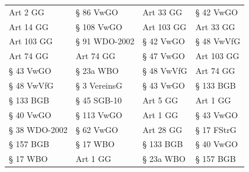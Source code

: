 \begin{tabular}{llll}
     Art 2 GG &            § 86 VwGO &  Art 33 GG &               § 42 VwGO \\
    Art 14 GG &           § 108 VwGO & Art 103 GG &               Art 33 GG \\
   Art 103 GG &        § 91 WDO-2002 &  § 42 VwGO &              § 48 VwVfG \\
    Art 74 GG &            Art 74 GG &  § 47 VwGO &              Art 103 GG \\
    § 43 VwGO &            § 23a WBO & § 48 VwVfG &               Art 74 GG \\
   § 48 VwVfG &         § 3 VereinsG &  § 43 VwGO &               § 133 BGB \\
    § 133 BGB &          § 45 SGB-10 &   Art 5 GG &                Art 1 GG \\
    § 40 VwGO &           § 113 VwGO &   Art 1 GG &               § 43 VwGO \\
§ 38 WDO-2002 &            § 62 VwGO &  Art 28 GG &              § 17 FStrG \\
    § 157 BGB &             § 17 WBO &  § 133 BGB &               § 40 VwGO \\
     § 17 WBO &             Art 1 GG &  § 23a WBO &               § 157 BGB \\
\bottomrule
\end{tabular}


